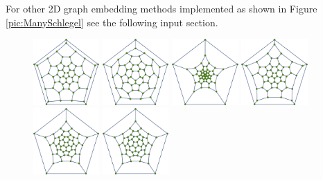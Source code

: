 \documentclass[article,a4paper,twoside]{memoir}
\begin{document}
For other 2D graph embedding methods implemented as shown in Figure \ref{pic:ManySchlegel} see the following input section.

\vspace{1cm}       
 \begin{figure}[htbp]
	\centering
  		 \includegraphics[width=0.225\textwidth]{Graph1.png}
		 \includegraphics[width=0.225\textwidth]{Graph2.png}
		 \includegraphics[width=0.225\textwidth]{Graph3.png}
		 \includegraphics[width=0.225\textwidth]{Graph4.png}
		 \includegraphics[width=0.225\textwidth]{Graph5.png}
		 \includegraphics[width=0.225\textwidth]{Graph6.png}

\end{figure}
\end{document}
